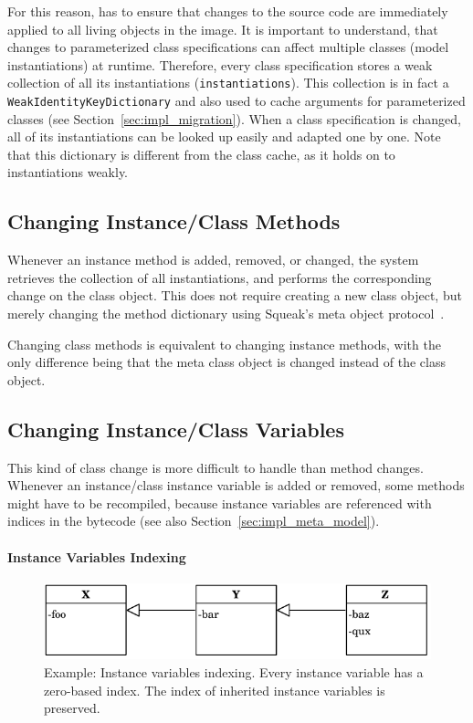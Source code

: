 For this reason, \msname has to ensure that changes to the source code are immediately applied to all living objects in the image. It is important to understand, that changes to parameterized class specifications can affect multiple classes (model instantiations) at runtime. Therefore, every class specification stores a weak collection of all its instantiations (\texttt{instantiations}). This collection is in fact a \texttt{WeakIdentityKeyDictionary} and also used to cache arguments for parameterized classes (see Section~\ref{sec:impl_migration}). When a class specification is changed, all of its instantiations can be looked up easily and adapted one by one. Note that this dictionary is different from the class cache, as it holds on to instantiations weakly.

\subsection{Changing Instance/Class Methods}
Whenever an instance method is added, removed, or changed, the system retrieves the collection of all instantiations, and performs the corresponding change on the class object. This does not require creating a new class object, but merely changing the method dictionary using Squeak's meta object protocol~\cite{Goldberg:1983:SLI:273, Kiczales:1991:AMP:574212}.

Changing class methods is equivalent to changing instance methods, with the only difference being that the meta class object is changed instead of the class object.

\subsection{Changing Instance/Class Variables}
\label{sec:impl_ch_inst_cl_vars}
This kind of class change is more difficult to handle than method changes. Whenever an instance/class instance variable is added or removed, some methods might have to be recompiled, because instance variables are referenced with indices in the bytecode (see also Section~\ref{sec:impl_meta_model}). 

\paragraph{Instance Variables Indexing}
\begin{figure}[!htp]
	\centering
	\includegraphics[scale=1]{inst_vars.pdf}
	\caption[Example: Instance variables indexing]{Example: Instance variables indexing. Every instance variable has a zero-based index. The index of inherited instance variables is preserved.}
	\label{fig:impl_inst_vars}
\end{figure}

